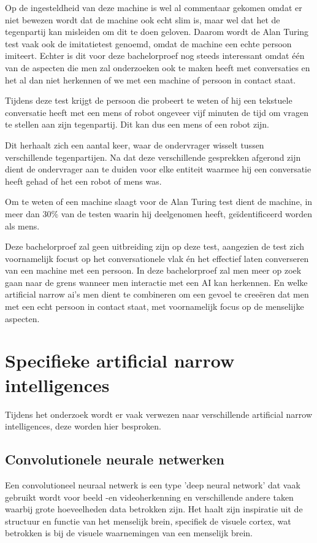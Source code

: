Op de ingesteldheid van deze machine is wel al commentaar gekomen omdat er niet bewezen wordt dat de machine ook echt slim is, maar wel dat het de tegenpartij kan misleiden om dit te doen geloven. Daarom wordt de Alan Turing test vaak ook de imitatietest genoemd, omdat de machine een echte persoon imiteert. Echter is dit voor deze bachelorproef nog steeds interessant omdat één van de aspecten die men zal onderzoeken ook te maken heeft met conversaties en het al dan niet herkennen of we met een machine of persoon in contact staat. 

Tijdens deze test krijgt de persoon die probeert te weten of hij een tekstuele conversatie heeft met een mens of robot ongeveer vijf minuten de tijd om vragen te stellen aan zijn tegenpartij. Dit kan dus een mens of een robot zijn. 

Dit herhaalt zich een aantal keer, waar de ondervrager wisselt tussen verschillende tegenpartijen. Na dat deze verschillende gesprekken afgerond zijn dient de ondervrager aan te duiden voor elke entiteit waarmee hij een conversatie heeft gehad of het een robot of mens was.

Om te weten of een machine slaagt voor de Alan Turing test dient de machine, in meer dan 30\% van de testen waarin hij deelgenomen heeft, geïdentificeerd worden als mens. 

Deze bachelorproef zal geen uitbreiding zijn op deze test, aangezien de test zich voornamelijk focust op het conversationele vlak én het effectief laten converseren van een machine met een persoon. In deze bachelorproef zal men meer op zoek gaan naar de grens wanneer men interactie met een AI kan herkennen. En welke artificial narrow ai's men dient te combineren om een gevoel te creeëren dat men met een echt persoon in contact staat, met voornamelijk focus op de menselijke aspecten.

\section{Specifieke artificial narrow intelligences}

Tijdens het onderzoek wordt er vaak verwezen naar verschillende artificial narrow intelligences, deze worden hier besproken.

\subsection{Convolutionele neurale netwerken}

Een convolutioneel neuraal netwerk is een type 'deep neural network' dat vaak gebruikt wordt voor beeld -en videoherkenning en verschillende andere taken waarbij grote hoeveelheden data betrokken zijn. Het haalt zijn inspiratie uit de structuur en functie van het menselijk brein, specifiek de visuele cortex, wat betrokken is bij de visuele waarnemingen van een menselijk brein.

